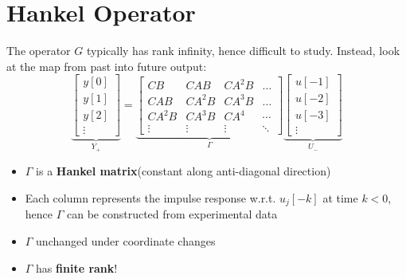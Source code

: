 \documentclass[10pt,a4paper,oneside]{article}
\begin{document}
\section{Hankel Operator}
The operator $G$ typically has rank infinity, hence difficult to study. Instead, look at the map from past into future output:
\[
\underbrace{\left[\begin{array}{c}{y[0]} \\ {y[1]} \\ {y[2]} \\ {\vdots}\end{array}\right]}_\text{$Y_{+}$}=\underbrace{\left[\begin{array}{cccc}{C B} & {C A B} & {C A^{2} B} & {\dots} \\ {C A B} & {C A^{2} B} & {C A^{3} B} & {\dots} \\ {C A^{2} B} & {C A^{3} B} & {C A^{4}} & {\cdots} \\ {\vdots} & {\vdots} & {\vdots} & {\ddots}\end{array}\right]}_\text{$\Gamma$}\underbrace{\left[\begin{array}{c}{u[-1]} \\ {u[-2]} \\ {u[-3]} \\ {\vdots}\end{array}\right]}_\text{$U_-$}
\]
\begin{itemize}
\item $\Gamma$ is a \textbf{Hankel matrix}(constant along anti-diagonal direction)
\item Each column represents the impulse response w.r.t. $u_j[-k]$ at time $k<0$, hence $\Gamma$ can be constructed from experimental data
\item $\Gamma$ unchanged under coordinate changes
\item $\Gamma$ has {\bfseries finite rank}!
\end{itemize}
\end{document}
